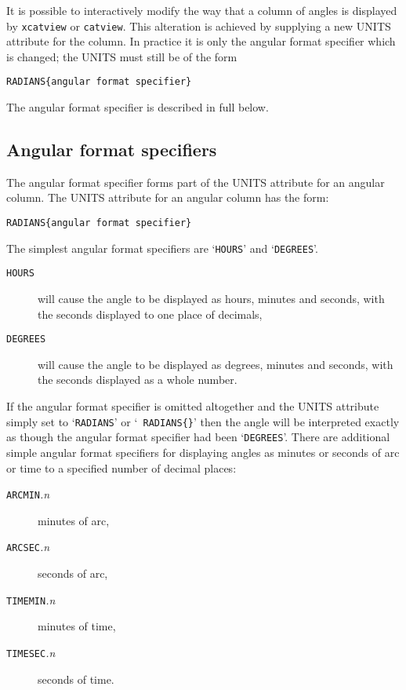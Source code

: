 \documentclass[twoside,11pt]{article}
\renewcommand{\_}{\texttt{\symbol{95}}}
\begin{document}
It is possible to interactively modify the way that a column of angles
is displayed by {\tt xcatview} or {\tt catview}. This alteration is
achieved by supplying a new UNITS attribute for the column. In practice
it is only the angular format specifier which is changed; the UNITS must
still be of the form

\begin{center}
{\tt RADIANS\{angular format specifier\} }
\end{center}

The angular format specifier is described in full below.

\subsection{Angular format specifiers}

The angular format specifier forms part of the UNITS attribute for an
angular column. The UNITS attribute for an angular column has the
form:

\begin{center}
{\tt RADIANS\{angular format specifier\} }
\end{center}

The simplest angular format specifiers are `{\tt HOURS}' and
`{\tt DEGREES}'.

\begin{description}

  \item[{\tt HOURS}] will cause the angle to be displayed as
   hours, minutes and seconds, with the seconds displayed to one
   place of decimals,

  \item[{\tt DEGREES}] will cause the angle to be displayed as
   degrees, minutes and seconds, with the seconds displayed as a
   whole number.

\end{description}

If the angular format specifier is omitted altogether and
the UNITS attribute simply set to `{\tt RADIANS}' or `{\tt
RADIANS\{\}}' then the angle will be interpreted exactly as
though the angular format specifier had been `{\tt DEGREES}'.
There are additional simple angular format specifiers for displaying
angles as minutes or seconds of arc or time to a specified number of
decimal places:

\begin{description}

  \item[{\tt ARCMIN}{\it .n}] minutes of arc,

  \item[{\tt ARCSEC}{\it .n}] seconds of arc,

  \item[{\tt TIMEMIN}{\it .n}] minutes of time,

  \item[{\tt TIMESEC}{\it .n}] seconds of time.


\end{description}
\end{document}

